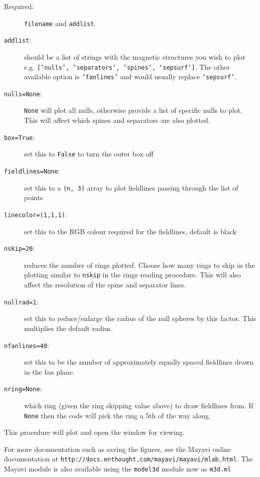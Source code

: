 \documentclass[12pt]{article}
\begin{document}
      \begin{description}
        \item [Required:] \texttt{filename} and \texttt{addlist}.
        \item [\texttt{addlist}:] should be a list of strings with the magnetic structures you wish to plot e.g. \texttt{[`nulls', `separators', `spines', `sepsurf']}. The other available option is \texttt{`fanlines'} and would usually replace \texttt{`sepsurf'}.
        \item [\texttt{nulls=None}:] \texttt{None} will plot all nulls, otherwise provide a list of specific nulls to plot. This will affect which spines and separators are also plotted.
        \item [\texttt{box=True}:] set this to \texttt{False} to turn the outer box off
        \item [\texttt{fieldlines=None}:] set this to a \texttt{(n, 3)} array to plot fieldlines passing through the list of points
        \item [\texttt{linecolor=(1,1,1)}:] set this to the RGB colour required for the fieldlines, default is black
        \item [\texttt{nskip=20}:] reduces the number of rings plotted. Choose how many rings to skip in the plotting similar to \texttt{nskip} in the rings reading procedure. This will also affect the resolution of the spine and separator lines.
        \item [\texttt{nullrad=1}:] set this to reduce/enlarge the radius of the null spheres by this factor. This multiplies the default radius.
        \item [\texttt{nfanlines=40}:] set this to be the number of approximately equally spaced fieldlines drawn in the fan plane.
        \item [\texttt{nring=None}:] which ring (given the ring skipping value above) to draw fieldlines from. If \texttt{None} then the code will pick the ring a 5th of the way along.
      \end{description}

      This procedure will plot and open the window for viewing.

      For more documentation such as saving the figures, see the Mayavi online documentation at \texttt{http://docs.enthought.com/mayavi/mayavi/mlab.html}. The Mayavi module is also available using the \texttt{model3d} module now as \texttt{m3d.ml}
\end{document}

